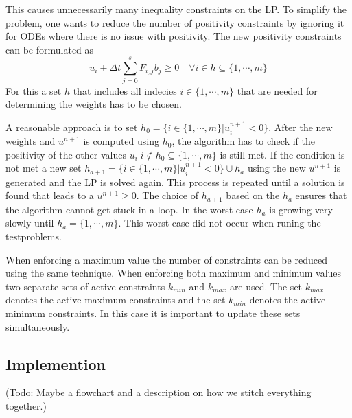 \documentclass[a4paper]{article}
\numberwithin{equation}{section}
\theoremstyle{plain}
\theoremstyle{definition}
\numberwithin{theorem}{section}
\newcommand{\dt}{{\Delta t}}
\newcommand{\1}{\mathbbm{1}}
\begin{document}
This causes unnecessarily many inequality constraints on the LP. To simplify the problem, one wants to reduce the number of positivity constraints by ignoring it for ODEs where there is no issue with positivity.
The new positivity constraints can be formulated as
\begin{equation}
u_i + \dt \sum_{j=0}^s F_{i,j}  b_j  \geq 0 \quad   \forall {i \in h \subseteq \{1,\cdots,m \}} 
\end{equation}
For this a set $h$ that includes all indecies $i \in \{1,\cdots,m \}$ that are needed for determining the weights has to be chosen.

A reasonable approach is to set $h_0 = \{ i \in \{1,\cdots,m \} |  u_i^{n+1}  < 0 \}$. 
After the new weights and $u^{n+1}$ is computed using $h_0$, the algorithm has to check if the positivity of the other values $u_i | i \notin h_0 \subseteq \{1,\cdots,m \}$ is still met. 
If the condition is not met a new set $h_{a+1} = \{ i \in \{1,\cdots,m \}|  u_i^{n+1}  < 0 \} \cup h_{a}$ using the new $u^{n+1}$ is generated and the LP is solved again. This process is repeated until a solution is found that leads to a $u^{n+1} \geq 0$. The choice of $h_{a+1}$ based on the $h_{a}$ ensures that the algorithm cannot get stuck in a loop. In the worst case $h_a$ is growing very slowly until $h_a = \{1,\cdots,m \}$. 
This worst case did not occur when runing the testproblems. 

When enforcing a maximum value the number of constraints can be reduced using the same technique. When enforcing both maximum and minimum values two separate sets of active constraints $k_{min}$ and $k_{max}$ are used. The set $k_{max}$ denotes the active maximum constraints and the set $k_{min}$ denotes the active minimum constraints. 
In this case it is important to update these sets simultaneously.  

\subsection{Implemention}
(Todo: Maybe a flowchart and a description on how we stitch everything together.) 
\end{document}
